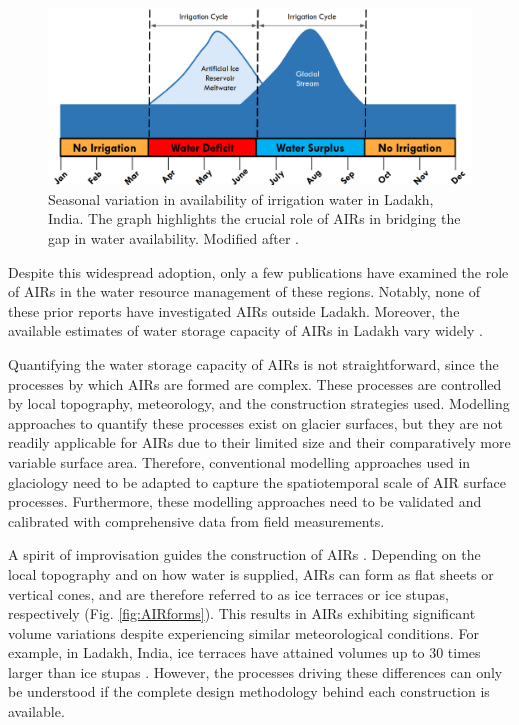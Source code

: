 \begin{figure}[htb] \centering \includegraphics[width=\textwidth]{figs/irrigation_cycles.png}
	\caption{Seasonal variation in availability of irrigation water in Ladakh, India. The graph highlights the
		crucial role of \ac{AIRs} in bridging the gap in water availability. Modified after
		\citet{nusserLocalKnowledgeGlobal2016}.} \label{fig:irrigation_cycles} \end{figure}


Despite this widespread adoption, only a few publications have examined the role of \ac{AIRs} in the water
resource management of these regions. Notably, none of these prior reports have investigated \ac{AIRs} outside
Ladakh. Moreover, the available estimates of water storage capacity of \ac{AIRs} in Ladakh vary widely
\citep{norphelSnowWaterHarvesting2015, baglaArtificialGlaciersHelp1998}.

Quantifying the water storage capacity of \ac{AIRs} is not straightforward, since the processes by which
\ac{AIRs} are formed are complex. These processes are controlled by local topography, meteorology, and the
construction strategies used. Modelling approaches to quantify these processes exist on glacier surfaces, but
they are not readily applicable for \ac{AIRs} due to their limited size and their comparatively more variable
surface area. Therefore, conventional modelling approaches used in glaciology need to be adapted to capture the
spatiotemporal scale of \ac{AIR} surface processes. Furthermore, these modelling approaches need to be validated
and calibrated with comprehensive data from field measurements.

A spirit of improvisation guides the construction of \ac{AIRs} \citep{clouseLadakhArtificialGlaciers2017}.
Depending on the local topography and on how water is supplied, \ac{AIRs} can form as flat sheets or vertical
cones, and are therefore referred to as ice terraces or ice stupas, respectively (Fig. \ref{fig:AIRforms}). This
results in \ac{AIRs} exhibiting significant volume variations despite experiencing similar meteorological
conditions. For example, in Ladakh, India, ice terraces have attained volumes up to 30 times larger than ice
stupas \citep{nusserSociohydrologyArtificialGlaciers2019}. However, the processes driving these differences can
only be understood if the complete design methodology behind each construction is available.

